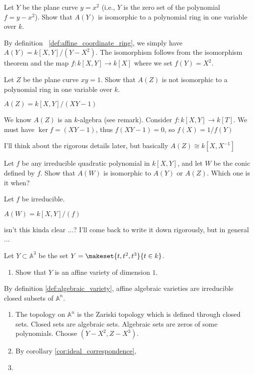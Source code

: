 \begin{exercise}
    Let \( Y \) be the plane curve \( y = x^2 \) (i.e., \( Y \) is the zero set of the polynomial \( f = y - x^2 \)). Show that \( A(Y) \) is isomorphic to a polynomial ring in one variable over \( k \).
\end{exercise}
\begin{solution}
    By definition ~\ref{def:affine_coordinate_ring}, we simply have \(A(Y) = k[X, Y] / (Y - X^2)\). The isomorphism follows from the isomorphism theorem and the map \(f: k[X, Y] \rightarrow k[X]\) where we set \(f(Y) = X^2\).
\end{solution}
\begin{exercise}
    Let \(Z\) be the plane curve \(xy = 1\). Show that \(A(Z)\) is not isomorphic to a polynomial ring in one variable over \(k\). 
\end{exercise}
\begin{solution}
    \(A(Z) = k[X, Y] / (XY - 1)\)

    We know \(A(Z)\) is an \(k\)-algebra (see remark). Consider \(f: k[X, Y] \longrightarrow k[T]\). We must have \(\ker{f} = (XY - 1)\), thus \(f(XY - 1) = 0\), so \(f(X) = 1 / f(Y)\)

    I'll think about the rigorous details later, but basically \(A(Z) \cong k[X, X^{-1}]\)
\end{solution}
\begin{exercise}
    Let \(f\) be any irreducible quadratic polynomial in \(k[X, Y]\), and let \(W\) be the conic defined by \(f\). Show that \(A(W)\) is isomorphic to \(A(Y)\) or \(A(Z)\). Which one is it when?
\end{exercise}
\begin{solution}
    Let \(f\) be irreducible.

    \(A(W) = k[X, Y] / (f)\)
    
    isn't this kinda clear ...? I'll come back to write it down rigorously, but in general ...
\end{solution}

\begin{exercise}
    Let \(Y \subset \mathbb{A}^3\) be the set \(Y = \makeset{t, t^2, t^3}{t \in k}\).
    \begin{enumerate}
        \item Show that \(Y\) is an affine variety of dimension \(1\).
    \end{enumerate}
\end{exercise}
\begin{solution}
    By definition \ref{def:algebraic_variety}, affine algebraic varieties are irreducible closed subsets of \(\mathbb{A}^n\).
    \begin{enumerate}
        \item The topology on \(\mathbb{A}^n\) is the Zariski topology which is defined through closed sets. Closed sets are algebraic sets. Algebraic sets are zeros of some polynomials. Choose \((Y - X^2, Z - X^3)\).
        \item By corollary \ref{cor:ideal_correspondence},
        \item 
    \end{enumerate}
\end{solution}

